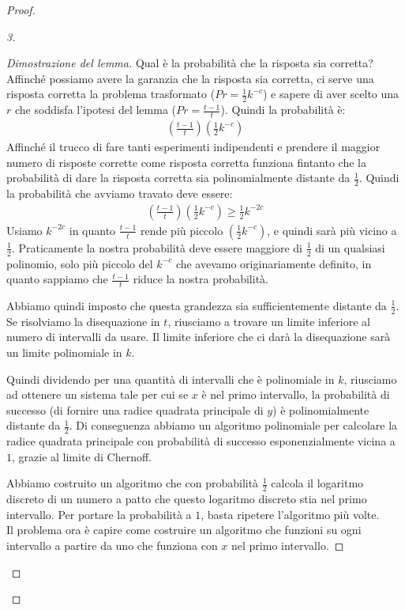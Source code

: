 \begin{proof}
\begin{proof}[3]
\begin{proof}[Dimostrazione del lemma]
Qual è la probabilità che la risposta sia corretta? Affinché possiamo avere la garanzia che la risposta sia corretta, ci serve una risposta corretta la problema trasformato ($Pr = \frac{1}{2}k^{-c}$) e sapere di aver scelto una $r$ che soddisfa l'ipotesi del lemma ($Pr = \frac{t-1}{t}$). Quindi la probabilità è:
\begin{align*}
   \left(\frac{t-1}{t}\right) \left(\frac{1}{2}k^{-c}\right)
\end{align*}
\noindent Affinché il trucco di fare tanti esperimenti indipendenti e prendere il maggior numero di risposte corrette come risposta corretta funziona fintanto che la probabilità di dare la risposta corretta sia polinomialmente distante da $\frac{1}{2}$. Quindi la probabilità che avviamo travato deve essere:
\begin{align*}
   \left(\frac{t-1}{t}\right) \left(\frac{1}{2}k^{-c}\right) \ge \frac{1}{2}k^{-2c}
\end{align*}
\noindent Usiamo $k^{-2c}$ in quanto $\frac{t-1}{t}$ rende più piccolo $\left(\frac{1}{2}k^{-c}\right)$, e quindi sarà più vicino a $\frac{1}{2}$. Praticamente la nostra probabilità deve essere maggiore di $\frac{1}{2}$ di un qualsiasi polinomio, solo più piccolo del $k^{-c}$ che avevamo originariamente definito, in quanto sappiamo che $\frac{t-1}{t}$ riduce la nostra probabilità.

Abbiamo quindi imposto che questa grandezza sia sufficientemente distante da $\frac{1}{2}$. Se risolviamo la disequazione in $t$, riusciamo a trovare un limite inferiore al numero di intervalli da usare. Il limite inferiore che ci darà la disequazione sarà un limite polinomiale in $k$. 

Quindi dividendo per una quantità di intervalli che è polinomiale in $k$, riusciamo ad ottenere un sistema tale per cui se $x$ è nel primo intervallo, la probabilità di successo (di fornire una radice quadrata principale di $y$) è polinomialmente distante da $\frac{1}{2}$. Di conseguenza abbiamo un algoritmo polinomiale per calcolare la radice quadrata principale con probabilità di successo esponenzialmente vicina a $1$, grazie al limite di Chernoff.

Abbiamo costruito un algoritmo che con probabilità $\frac{1}{2}$ calcola il logaritmo discreto di un numero a patto che questo logaritmo discreto stia nel primo intervallo. Per portare la probabilità a $1$, basta ripetere l'algoritmo più volte. \\

\noindent Il problema ora è capire come costruire un algoritmo che funzioni su ogni intervallo a partire da uno che funziona con $x$ nel primo intervallo. 


\end{proof}
\end{proof}
\end{proof}
